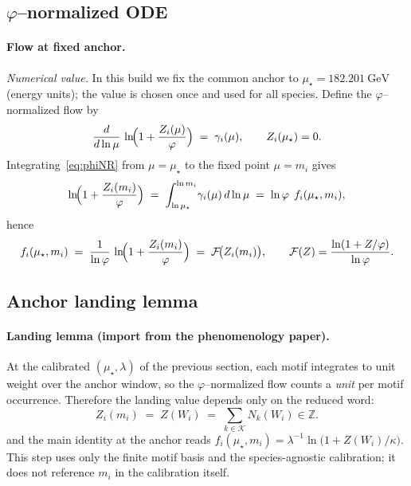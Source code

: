 \documentclass[epjc3]{svjour3}
\begin{document}
\subsection{$\varphi$--normalized ODE}

\paragraph{Flow at fixed anchor.}
\noindent\emph{Numerical value.} In this build we fix the common anchor to
\(
\mu_\star = 182.201~\text{GeV}
\)
(energy units); the value is chosen once and used for all species.%
Define the $\varphi$--normalized flow by
\begin{equation}
  \frac{d}{d\ln\mu}\,
  \ln\!\Bigl(1+\frac{Z_i(\mu)}{\varphi}\Bigr)
  \;=\;
  \gamma_i(\mu),
  \qquad
  Z_i(\mu_\star)=0.
  \label{eq:phiNR}
\end{equation}
Integrating~\eqref{eq:phiNR} from $\mu=\mu_\star$ to the fixed point $\mu=m_i$ gives
\begin{equation}
  \ln\!\Bigl(1+\frac{Z_i(m_i)}{\varphi}\Bigr)
  \;=\;
  \int_{\ln\mu_\star}^{\ln m_i}\!\gamma_i(\mu)\,d\ln\mu
  \;=\;
  \ln\varphi\;\, f_i(\mu_\star,m_i),
\end{equation}
hence
\begin{equation}
  f_i(\mu_\star,m_i)
  \;=\;
  \frac{1}{\ln\varphi}\,\ln\!\Bigl(1+\frac{Z_i(m_i)}{\varphi}\Bigr)
  \;=\;
  \mathcal F\!\bigl(Z_i(m_i)\bigr),
  \qquad
  \mathcal F(Z)=\frac{\ln(1+Z/\varphi)}{\ln\varphi}.
  \label{eq:phiNR-solution}
\end{equation}

\subsection{Anchor landing lemma}

\paragraph{Landing lemma (import from the phenomenology paper).}
At the calibrated $(\mu_\star,\lambda)$ of the previous section,
each motif integrates to unit weight over the anchor window, so the
$\varphi$--normalized flow counts a \emph{unit} per motif occurrence.
Therefore the landing value depends only on the reduced word:
\[
  Z_i(m_i)\;=\;Z(W_i)\;=\;\sum_{k\in\mathcal K} N_k(W_i)\in\mathbb{Z}.
\]
and the main identity at the anchor reads
\(
  f_i(\mu_\star,m_i)=\lambda^{-1}\ln\bigl(1+Z(W_i)/\kappa\bigr).
\)
This step uses only the finite motif basis and the species-agnostic calibration; it does not reference $m_i$ in the calibration itself.
\end{document}
